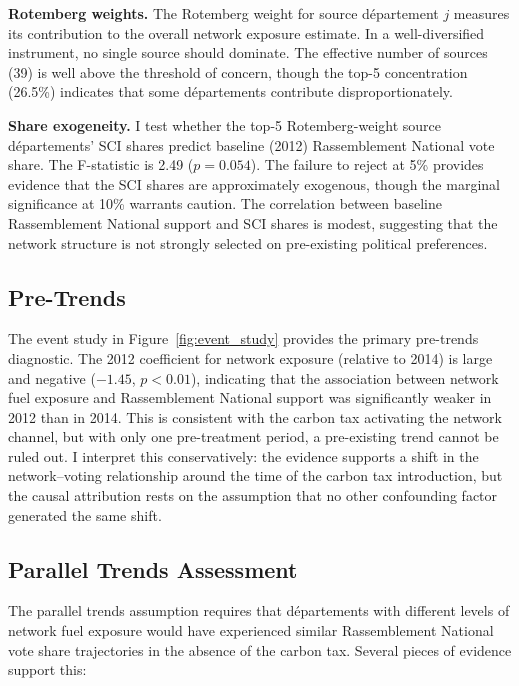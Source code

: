 \documentclass[12pt]{article}
\newcommand{\rn}{Rassemblement National}
\newcommand{\dept}{d\'{e}partement}
\newcommand{\depts}{d\'{e}partements}
\begin{document}
\textbf{Rotemberg weights.} The Rotemberg weight for source \dept{} $j$ measures its contribution to the overall network exposure estimate. In a well-diversified instrument, no single source should dominate. The effective number of sources (39) is well above the threshold of concern, though the top-5 concentration (26.5\%) indicates that some \depts{} contribute disproportionately.

\textbf{Share exogeneity.} I test whether the top-5 Rotemberg-weight source \depts{}' SCI shares predict baseline (2012) \rn{} vote share. The F-statistic is 2.49 ($p = 0.054$). The failure to reject at 5\% provides evidence that the SCI shares are approximately exogenous, though the marginal significance at 10\% warrants caution. The correlation between baseline \rn{} support and SCI shares is modest, suggesting that the network structure is not strongly selected on pre-existing political preferences.

\subsection{Pre-Trends}

The event study in Figure~\ref{fig:event_study} provides the primary pre-trends diagnostic. The 2012 coefficient for network exposure (relative to 2014) is large and negative ($-1.45$, $p < 0.01$), indicating that the association between network fuel exposure and \rn{} support was significantly weaker in 2012 than in 2014. This is consistent with the carbon tax activating the network channel, but with only one pre-treatment period, a pre-existing trend cannot be ruled out. I interpret this conservatively: the evidence supports a shift in the network--voting relationship around the time of the carbon tax introduction, but the causal attribution rests on the assumption that no other confounding factor generated the same shift.

\subsection{Parallel Trends Assessment}

The parallel trends assumption requires that \depts{} with different levels of network fuel exposure would have experienced similar \rn{} vote share trajectories in the absence of the carbon tax. Several pieces of evidence support this:
\end{document}
